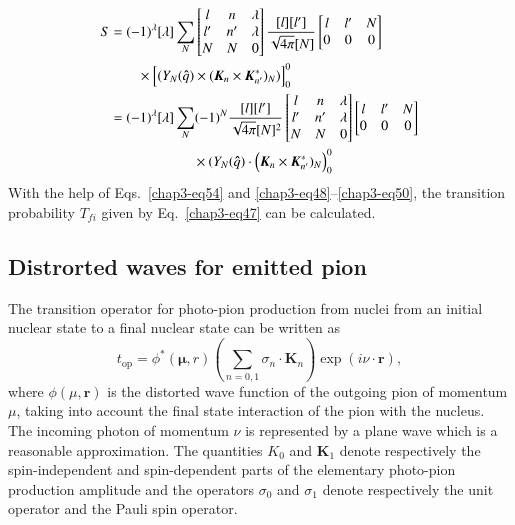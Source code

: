 \begin{align}
  S & = (-1)^\lambda [\lambda] \sum_{N} \begin{bmatrix} l & n & \lambda\\ l' & n' & \lambda\\ N & N & 0  \end{bmatrix}
  \frac{[l][l']}{\sqrt{4 \pi}[N]} \begin{bmatrix}l & l' & N\\ 0 & 0 & 0  \end{bmatrix}\notag \\
       & \qquad  \times \Bigl[(Y_N ({\boldsymbol \hat{q}}) \times ({\boldsymbol K}_n \times {\boldsymbol K_{n'}^\ast})_N)\Bigr]_0^0\notag \\
  & = (-1)^\lambda [\lambda] \sum_{N} (-1)^N  \frac{[l][l']}{\sqrt{4 \pi}[N]^2}
  \begin{bmatrix} l & n & \lambda\\ l' & n' & \lambda\\ N & N & 0  \end{bmatrix}
  \begin{bmatrix}l & l' & N\\ 0 & 0 & 0  \end{bmatrix} \notag \\
  & \qquad \qquad \qquad \times (Y_N ({\boldsymbol \hat{q}}) \cdot  \Bigl({\boldsymbol K}_n \times {\boldsymbol K_{n'}^\ast})_N\Bigr)_0^0\label{chap3-eq54}
\end{align}
With the help of Eqs.\ \eqref{chap3-eq54} and \eqref{chap3-eq48}--\eqref{chap3-eq50}, the transition probability $T_{fi}$ given by Eq.\ \eqref{chap3-eq47} can be calculated.

\subsection{Distrorted waves for emitted pion} \label{chap3-sec5.2}

The transition operator for photo-pion production from nuclei from an initial nuclear state to a final nuclear state can be written as
\begin{equation}
t_{\text{op}} = \phi^\ast ({\boldsymbol \mu, r}) \left( \sum_{n=0, 1} \sigma_n \cdot {\boldsymbol K}_n\right) \exp (i \nu \cdot {\boldsymbol r}), \label{chap3-eq55}
\end{equation}
where $\phi (\mu, {\boldsymbol r})$ is the distorted wave function of the outgoing pion of momentum $\mu$, taking into account the final state interaction of the pion with the nucleus. The incoming photon of momentum $\nu$ is represented by a plane wave which is a reasonable approximation. The quantities $K_0$ and ${\boldsymbol K}_1$ denote respectively the spin-independent and spin-dependent parts of the elementary photo-pion production amplitude and the operators $\sigma_0$ and $\sigma_1$ denote respectively the unit operator and the Pauli spin operator.

